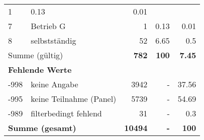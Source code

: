\begin{longtable}{lXrrr}
       \num{1} &
       \num[round-mode=places,round-precision=2]{0.13} &
         \num[round-mode=places,round-precision=2]{0.01} \\

     7 &
     \multicolumn{1}{X}{ Betrieb G   } &


       \num{1} &
       \num[round-mode=places,round-precision=2]{0.13} &
         \num[round-mode=places,round-precision=2]{0.01} \\

     8 &
     \multicolumn{1}{X}{ selbstständig   } &


       \num{52} &
       \num[round-mode=places,round-precision=2]{6.65} &
         \num[round-mode=places,round-precision=2]{0.5} \\
     \midrule
     \multicolumn{2}{l}{Summe (gültig)} &
       \textbf{\num{782}} &
     \textbf{\num{100}} &
       \textbf{\num[round-mode=places,round-precision=2]{7.45}} \\
     \multicolumn{5}{l}{\textbf{Fehlende Werte}}\\
       -998 &
       keine Angabe &
         \num{3942} &
        - &
         \num[round-mode=places,round-precision=2]{37.56} \\
       -995 &
       keine Teilnahme (Panel) &
         \num{5739} &
        - &
         \num[round-mode=places,round-precision=2]{54.69} \\
       -989 &
       filterbedingt fehlend &
         \num{31} &
        - &
         \num[round-mode=places,round-precision=2]{0.3} \\
     \midrule
     \multicolumn{2}{l}{\textbf{Summe (gesamt)}} &
          \textbf{\num{10494}} &
        \textbf{-} &
        \textbf{\num{100}} \\
     \bottomrule
     \end{longtable}
     
